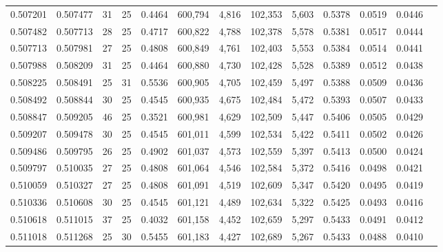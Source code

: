 \begin{tabular}{rrrrrrrrrrrrr}
0.507201 & 0.507477 &    31 &  25 &                                     0.4464 & 600,794 &   4,816 & 102,353 &   5,603 & 0.5378 & 0.0519 & 0.0446 \\
0.507482 & 0.507713 &    28 &  25 &                                     0.4717 & 600,822 &   4,788 & 102,378 &   5,578 & 0.5381 & 0.0517 & 0.0444 \\
0.507713 & 0.507981 &    27 &  25 &                                     0.4808 & 600,849 &   4,761 & 102,403 &   5,553 & 0.5384 & 0.0514 & 0.0441 \\
0.507988 & 0.508209 &    31 &  25 &                                     0.4464 & 600,880 &   4,730 & 102,428 &   5,528 & 0.5389 & 0.0512 & 0.0438 \\
0.508225 & 0.508491 &    25 &  31 &                                     0.5536 & 600,905 &   4,705 & 102,459 &   5,497 & 0.5388 & 0.0509 & 0.0436 \\
0.508492 & 0.508844 &    30 &  25 &                                     0.4545 & 600,935 &   4,675 & 102,484 &   5,472 & 0.5393 & 0.0507 & 0.0433 \\
0.508847 & 0.509205 &    46 &  25 &                                     0.3521 & 600,981 &   4,629 & 102,509 &   5,447 & 0.5406 & 0.0505 & 0.0429 \\
0.509207 & 0.509478 &    30 &  25 &                                     0.4545 & 601,011 &   4,599 & 102,534 &   5,422 & 0.5411 & 0.0502 & 0.0426 \\
0.509486 & 0.509795 &    26 &  25 &                                     0.4902 & 601,037 &   4,573 & 102,559 &   5,397 & 0.5413 & 0.0500 & 0.0424 \\
0.509797 & 0.510035 &    27 &  25 &                                     0.4808 & 601,064 &   4,546 & 102,584 &   5,372 & 0.5416 & 0.0498 & 0.0421 \\
0.510059 & 0.510327 &    27 &  25 &                                     0.4808 & 601,091 &   4,519 & 102,609 &   5,347 & 0.5420 & 0.0495 & 0.0419 \\
0.510336 & 0.510608 &    30 &  25 &                                     0.4545 & 601,121 &   4,489 & 102,634 &   5,322 & 0.5425 & 0.0493 & 0.0416 \\
0.510618 & 0.511015 &    37 &  25 &                                     0.4032 & 601,158 &   4,452 & 102,659 &   5,297 & 0.5433 & 0.0491 & 0.0412 \\
0.511018 & 0.511268 &    25 &  30 &                                     0.5455 & 601,183 &   4,427 & 102,689 &   5,267 & 0.5433 & 0.0488 & 0.0410 \\

\end{tabular}

